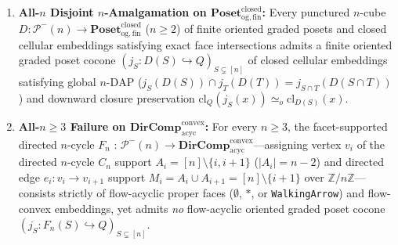 \begin{theorem}\label{thm:directed-cubical-amalgamation}%
%
\leanok%
%
\leavevmode
\begin{enumerate}
  \item \textbf{All-$n$ Disjoint $n$-Amalgamation on $\mathbf{Poset}_{\mathrm{og,fin}}^{\mathrm{closed}}$:} Every punctured $n$-cube $D : \mathcal{P}^-(n) \to \mathbf{Poset}_{\mathrm{og,fin}}^{\mathrm{closed}}$ ($n \ge 2$) of finite oriented graded posets and closed cellular embeddings satisfying exact face intersections admits a finite oriented graded poset cocone $(j_S : D(S) \hookrightarrow Q)_{S \subsetneq [n]}$ of closed cellular embeddings satisfying global $n$-$\mathrm{DAP}$ ($j_S(D(S)) \cap j_T(D(T)) = j_{S \cap T}(D(S \cap T))$) and downward closure preservation $\mathrm{cl}_Q(j_S(x)) \simeq_o \mathrm{cl}_{D(S)}(x)$.
  \item \textbf{All-$n \ge 3$ Failure on $\mathbf{DirComp}_{\mathrm{acyc}}^{\mathrm{convex}}$:} For every $n \ge 3$, the facet-supported directed $n$-cycle $F_n$ : $\mathcal{P}^-(n) \to \mathbf{DirComp}_{\mathrm{acyc}}^{\mathrm{convex}}$---assigning vertex $v_i$ of the directed $n$-cycle $C_n$ support $A_i = [n] \setminus \{i, i+1\}$ ($|A_i| = n - 2$) and directed edge $e_i : v_i \to v_{i+1}$ support $M_i = A_i \cup A_{i+1} = [n] \setminus \{i+1\}$ over $\mathbb{Z}/n\mathbb{Z}$---consists strictly of flow-acyclic proper faces ($\emptyset$, $*$, or \texttt{WalkingArrow}) and flow-convex embeddings, yet admits \emph{no} flow-acyclic oriented graded poset cocone $(j_S : F_n(S) \hookrightarrow Q)_{S \subsetneq [n]}$.
\end{enumerate}
\end{theorem}


